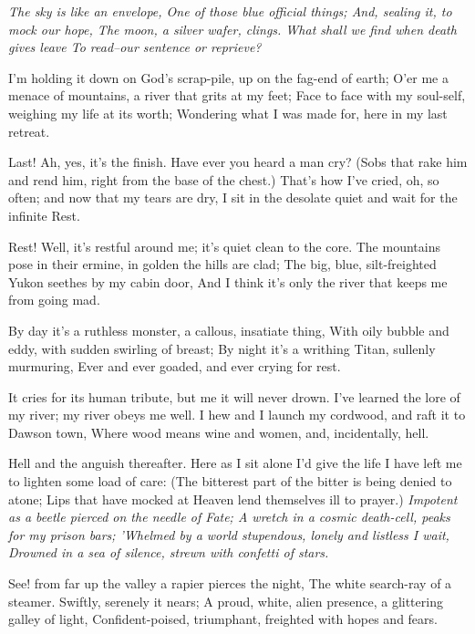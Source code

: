 
\begin{poemblock}
\textit{
  The sky is like an envelope,
   One of those blue official things;
  And, sealing it, to mock our hope,
   The moon, a silver wafer, clings.
  What shall we find when death gives leave
  To read--our sentence or reprieve?
}

 I'm holding it down on God's scrap-pile, up on the fag-end of earth;
  O'er me a menace of mountains, a river that grits at my feet;
 Face to face with my soul-self, weighing my life at its worth;
  Wondering what I was made for, here in my last retreat.

 Last!  Ah, yes, it's the finish.  Have ever you heard a man cry?
  (Sobs that rake him and rend him, right from the base of the chest.)
 That's how I've cried, oh, so often; and now that my tears are dry,
  I sit in the desolate quiet and wait for the infinite Rest.

 Rest!  Well, it's restful around me; it's quiet clean to the core.
  The mountains pose in their ermine, in golden the hills are clad;
 The big, blue, silt-freighted Yukon seethes by my cabin door,
  And I think it's only the river that keeps me from going mad.

 By day it's a ruthless monster, a callous, insatiate thing,
  With oily bubble and eddy, with sudden swirling of breast;
 By night it's a writhing Titan, sullenly murmuring,
  Ever and ever goaded, and ever crying for rest.

 It cries for its human tribute, but me it will never drown.
  I've learned the lore of my river; my river obeys me well.
 I hew and I launch my cordwood, and raft it to Dawson town,
  Where wood means wine and women, and, incidentally, hell.

 Hell and the anguish thereafter.  Here as I sit alone
  I'd give the life I have left me to lighten some load of care:
 (The bitterest part of the bitter is being denied to atone;
  Lips that have mocked at Heaven lend themselves ill to prayer.)
\textit{
  Impotent as a beetle pierced on the needle of Fate;
   A wretch in a cosmic death-cell, peaks for my prison bars;
  'Whelmed by a world stupendous, lonely and listless I wait,
   Drowned in a sea of silence, strewn with confetti of stars.
}

 See! from far up the valley a rapier pierces the night,
  The white search-ray of a steamer.  Swiftly, serenely it nears;
 A proud, white, alien presence, a glittering galley of light,
  Confident-poised, triumphant, freighted with hopes and fears.


\end{poemblock}
